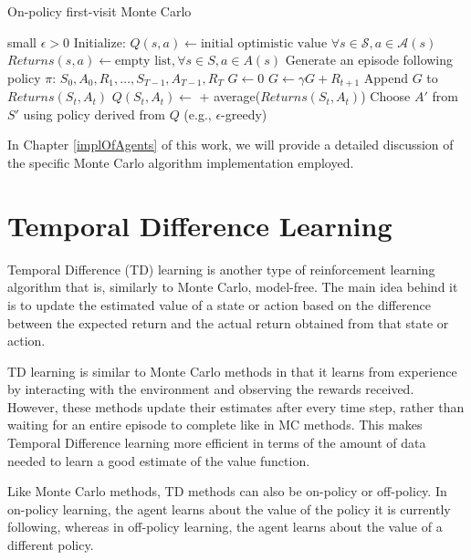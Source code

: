 \begin{algorithm}
\caption{On-policy first-visit Monte Carlo}\label{algo:MC}
\begin{algorithmic}[1]
\Require small $\epsilon >0$
\State Initialize:
\State \hspace{0.5cm} $Q(s,a) \gets \text{initial optimistic value } \forall s\in \mathcal{S}, a\in \mathcal{A}(s)$
\State \hspace{0.5cm} $Returns(s,a) \gets \text{empty list}, \forall s\in S, a\in A(s)$
\Repeat
\State Generate an episode following policy $\pi$: $S_0, A_0, R_1,\dots, S_{T-1}, A_{T-1}, R_T$
\State $G \gets 0$
\State $G \gets \gamma G + R_{t+1}$
\State Append $G$ to $Returns(S_t, A_t)$
\State $Q(S_t, A_t) \gets$   + average($Returns(S_t, A_t)$)
\State Choose $A'$ from $S'$ using policy derived from $Q$ (e.g., $\epsilon$-greedy)
\EndIf
\EndFor
{}
\end{algorithmic}
\end{algorithm}

In Chapter \ref{implOfAgents} of this work, we will provide a detailed discussion of the specific Monte Carlo algorithm implementation employed.

\section{Temporal Difference Learning}
Temporal Difference (TD) learning is another type of reinforcement learning algorithm that is, similarly to Monte Carlo, model-free. The main idea behind it is to update the estimated value of a state or action based on the difference between the expected return and the actual return obtained from that state or action. 

TD learning is similar to Monte Carlo methods in that it learns from experience by interacting with the environment and observing the rewards received. However, these methods update their estimates after every time step, rather than waiting for an entire episode to complete like in MC methods. This makes Temporal Difference learning more efficient in terms of the amount of data needed to learn a good estimate of the value function.

Like Monte Carlo methods, TD methods can also be on-policy or off-policy. In on-policy learning, the agent learns about the value of the policy it is currently following, whereas in off-policy learning, the agent learns about the value of a different policy. 


